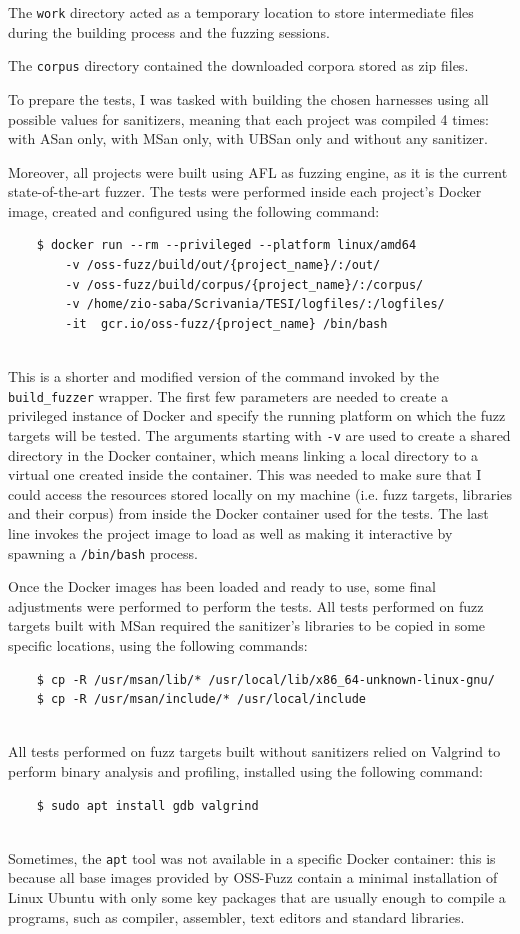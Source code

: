 The \verb|work| directory acted as a temporary location to store intermediate files during the building process and the fuzzing sessions.

The \verb|corpus| directory contained the downloaded corpora stored as zip files.


To prepare the tests, I was tasked with building the chosen harnesses using all possible values for sanitizers, meaning that each project was compiled 4 times: with ASan only, with MSan only, with UBSan only and without any sanitizer.

Moreover, all projects were built using AFL as fuzzing engine, as it is the current state-of-the-art fuzzer. 
The tests were performed inside each project's Docker image, created and configured using the following command:
\begin{verbatim}
    $ docker run --rm --privileged --platform linux/amd64 
        -v /oss-fuzz/build/out/{project_name}/:/out/
        -v /oss-fuzz/build/corpus/{project_name}/:/corpus/    
        -v /home/zio-saba/Scrivania/TESI/logfiles/:/logfiles/ 
        -it  gcr.io/oss-fuzz/{project_name} /bin/bash
\end{verbatim}
\ \\
This is a shorter and modified version of the command invoked by the \verb|build_fuzzer| wrapper.
The first few parameters are needed to create a privileged instance of Docker and specify the running platform on which the fuzz targets will be tested.
The arguments starting with \verb|-v| are used to create a shared directory in the Docker container, which means linking a local directory to a virtual one created inside the container. This was needed to make sure that I could access the resources stored locally on my machine (i.e. fuzz targets, libraries and their corpus) from inside the Docker container used for the tests.
The last line invokes the project image to load as well as making it interactive by spawning a \verb|/bin/bash| process.

 
 
 

Once the Docker images has been loaded and ready to use, some final adjustments were performed to perform the tests.
All tests performed on fuzz targets built with MSan required the sanitizer's libraries to be copied in some specific locations, using the following commands:
\begin{verbatim}
    $ cp -R /usr/msan/lib/* /usr/local/lib/x86_64-unknown-linux-gnu/
    $ cp -R /usr/msan/include/* /usr/local/include
\end{verbatim}
\ \\
All tests performed on fuzz targets built without sanitizers relied on Valgrind to perform binary analysis and profiling, installed using the following command:\begin{verbatim}
    $ sudo apt install gdb valgrind
\end{verbatim}
\ \\
Sometimes, the \verb|apt| tool was not available in a specific Docker container: this is because all base images provided by OSS-Fuzz contain a minimal installation of Linux Ubuntu with only some key packages that are usually enough to compile a programs, such as compiler, assembler, text editors and standard libraries.

